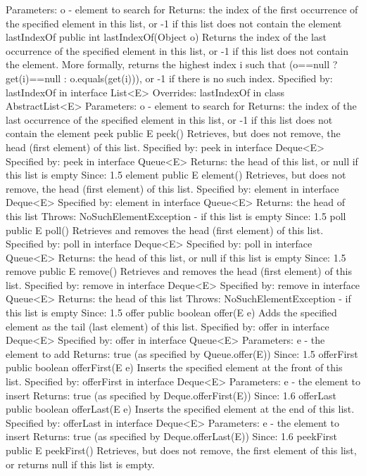 \documentclass{book}
\begin{document}
Parameters:
o - element to search for
Returns:
the index of the first occurrence of the specified element in this list, or -1 if this list does not contain the element
lastIndexOf
public int lastIndexOf(Object o)
Returns the index of the last occurrence of the specified element in this list, or -1 if this list does not contain the element. More formally, returns the highest index i such that (o==null ? get(i)==null : o.equals(get(i))), or -1 if there is no such index.
Specified by:
lastIndexOf in interface List<E>
Overrides:
lastIndexOf in class AbstractList<E>
Parameters:
o - element to search for
Returns:
the index of the last occurrence of the specified element in this list, or -1 if this list does not contain the element
peek
public E peek()
Retrieves, but does not remove, the head (first element) of this list.
Specified by:
peek in interface Deque<E>
Specified by:
peek in interface Queue<E>
Returns:
the head of this list, or null if this list is empty
Since:
1.5
element
public E element()
Retrieves, but does not remove, the head (first element) of this list.
Specified by:
element in interface Deque<E>
Specified by:
element in interface Queue<E>
Returns:
the head of this list
Throws:
NoSuchElementException - if this list is empty
Since:
1.5
poll
public E poll()
Retrieves and removes the head (first element) of this list.
Specified by:
poll in interface Deque<E>
Specified by:
poll in interface Queue<E>
Returns:
the head of this list, or null if this list is empty
Since:
1.5
remove
public E remove()
Retrieves and removes the head (first element) of this list.
Specified by:
remove in interface Deque<E>
Specified by:
remove in interface Queue<E>
Returns:
the head of this list
Throws:
NoSuchElementException - if this list is empty
Since:
1.5
offer
public boolean offer(E e)
Adds the specified element as the tail (last element) of this list.
Specified by:
offer in interface Deque<E>
Specified by:
offer in interface Queue<E>
Parameters:
e - the element to add
Returns:
true (as specified by Queue.offer(E))
Since:
1.5
offerFirst
public boolean offerFirst(E e)
Inserts the specified element at the front of this list.
Specified by:
offerFirst in interface Deque<E>
Parameters:
e - the element to insert
Returns:
true (as specified by Deque.offerFirst(E))
Since:
1.6
offerLast
public boolean offerLast(E e)
Inserts the specified element at the end of this list.
Specified by:
offerLast in interface Deque<E>
Parameters:
e - the element to insert
Returns:
true (as specified by Deque.offerLast(E))
Since:
1.6
peekFirst
public E peekFirst()
Retrieves, but does not remove, the first element of this list, or returns null if this list is empty.
\end{document}
